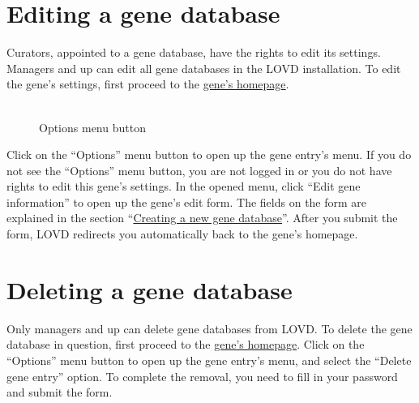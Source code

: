 \documentclass[a4paper,oneside,openany,12pt]{memoir}
\renewenvironment{leftbar}[1][\hsize]
{%
    \def\FrameCommand
    {%
        {\color{LOVDdark}\vrule width 3pt \hspace{5pt}}%
        \colorbox{LOVDlight}%
    }%
    \MakeFramed{\hsize#1\advance\hsize-\width\FrameRestore}%
}
{\endMakeFramed}
\begin{document}
\section{Editing a gene database}
Curators, appointed to a gene database, have the rights to edit its settings.
Managers and up can edit all gene databases in the LOVD installation.
To edit the gene's settings, first proceed to the \hyperlink{s_gene_homepage}{gene's homepage}.
\par
\begin{figure} %
  \vspace{-26pt}
  \begin{framed}
    \\Options menu button
  \end{framed}
\end{figure}
Click on the ``Options'' menu button to open up the gene entry's menu.
If you do not see the ``Options'' menu button, you are not logged in or you do not have rights to edit this gene's settings.
In the opened menu, click ``Edit gene information'' to open up the gene's edit form.
The fields on the form are explained in the section ``\hyperlink{s_gene_create}{Creating a new gene database}''.
After you submit the form, LOVD redirects you automatically back to the gene's homepage.





\hypertarget{s_gene_delete}{}
\section{Deleting a gene database}
Only managers and up can delete gene databases from LOVD.
To delete the gene database in question, first proceed to the \hyperlink{s_gene_homepage}{gene's homepage}.
Click on the ``Options'' menu button to open up the gene entry's menu, and select the ``Delete gene entry'' option.
To complete the removal, you need to fill in your password and submit the form.
\end{document}
